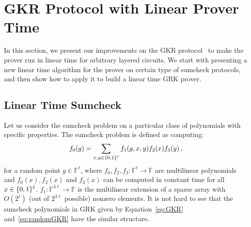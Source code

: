 \section{GKR Protocol with Linear Prover Time}
\label{sec::gkrlin}

In this section, we present our improvements on the GKR protocol~\cite{GKR} to make the prover run in linear time for arbitrary layered circuits. We start with presenting a new linear time algorithm for the prover on certain type of sumcheck protocols, and then show how to apply it to build a linear time GRK prover.

\subsection{Linear Time Sumcheck}

Let us consider the sumcheck problem on a particular class of polynomials with specific properties. The sumcheck problem is defined as computing:
\begin{equation}\label{eq:linearsc}
f_0(g) = \sum\limits_{x,y\in\{0,1\}^\ell}f_1(g,x,y)f_2(x)f_3(y)\, ,
\end{equation}
for a random point $g\in\mathbb{F}^\ell$, where $f_0,f_2,f_3: \mathbb{F}^\ell\rightarrow\mathbb{F}$ are multilinear polynomials and $f_0(x), f_2(x)$ and $f_3(x)$ can be computed in constant time for all $x\in\{0,1\}^\ell$. $f_1:\mathbb{F}^{3\ell}\rightarrow\mathbb{F}$ is the multilinear extension of a sparse array with $O(2^\ell)$ (out of $2^{3\ell}$ possible) nonzero elements. 
It is not hard to see that the sumcheck polynomials in GRK given by Equation~\ref{eq:GKR} and~\ref{eq:randomGKR} have the similar structure.

